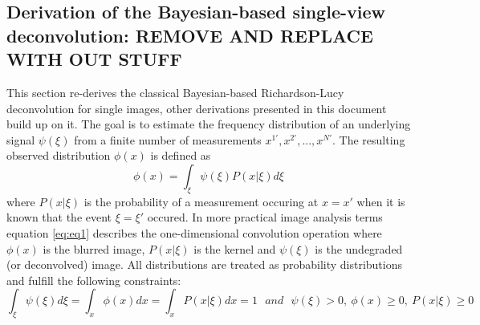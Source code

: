 \documentclass[]{spie}  %
\begin{document}
\subsection{Derivation of the Bayesian-based single-view deconvolution: REMOVE AND REPLACE WITH OUT STUFF}
\label{sec:singleview}

This section re-derives the classical Bayesian-based Richardson\cite{richardson1972}-Lucy\cite{lucy1974} deconvolution for single images, other derivations presented in this document build up on it. The goal is to estimate the frequency distribution of an underlying signal $\psi(\xi)$ from a finite number of measurements $x^{1'}, x^{2'}, ..., x^{N'}$. The resulting observed distribution $\phi(x)$ is defined as
\begin{equation}
\label{eq:eq1}
\phi(x) = \int_{\xi}{\psi(\xi)P(x|\xi)}d\xi
\end{equation}
where $P(x|\xi)$ is the probability of a measurement occuring at $x=x'$ when it is known that the event \mbox{$\xi=\xi'$} occured. In more practical image analysis terms equation \ref{eq:eq1} describes the one-dimensional convolution operation where $\phi(x)$ is the blurred image, $P(x|\xi)$ is the kernel and $\psi(\xi)$ is the undegraded (or deconvolved) image. All distributions are treated as probability distributions and fulfill the following constraints:
\begin{equation}
\label{eq:eq3}
\int_{\xi}{\psi(\xi)}d\xi = \int_{x}{\phi(x)}dx = \int_{x}{P(x|\xi)}dx = 1 ~~~and~~~ \psi(\xi) > 0, ~\phi(x) \geq 0, ~P(x|\xi) \geq 0
\end{equation}
\end{document}
